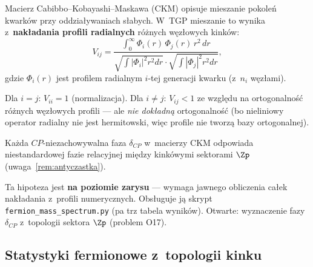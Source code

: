 \begin{hypothesis}%
\label{hyp:ckm}
Macierz Cabibbo--Kobayashi--Maskawa (CKM) opisuje mieszanie
pokole\'n kwarków przy oddzia\l{}ywaniach s\l{}abych.
W~TGP mieszanie to wynika z~\textbf{nak\l{}adania profili
radialnych} r\'o\.znych w\k{e}z\l{}owych kink\'ow:
\begin{equation}\label{eq:ckm-overlap}
    V_{ij}
    = \frac{\int_0^\infty \Phi_i(r)\,\Phi_j(r)\,r^2\,dr}
           {\sqrt{\int|\Phi_i|^2 r^2 dr}\cdot\sqrt{\int|\Phi_j|^2 r^2 dr}},
\end{equation}
gdzie $\Phi_i(r)$ jest profilem radialnym $i$-tej generacji kwarku
(z~$n_i$ w\k{e}z\l{}ami).

Dla $i = j$: $V_{ii} = 1$ (normalizacja).
Dla $i \neq j$: $V_{ij} < 1$ ze wzgl\k{e}du na ortogonalno\'s\'c
r\'o\.znych w\k{e}z\l{}owych profili --- ale \emph{nie dokładną}
ortogonalno\'s\'c (bo nieliniowy operator radialny nie jest
hermitowski, wi\k{e}c profile nie tworz\k{a} bazy ortogonalnej).

Ka\.zda $CP$-niezachowywalna faza $\delta_{CP}$ w~macierzy CKM
odpowiada niestandardowej fazie relacyjnej mi\k{e}dzy kink\'owymi
sektorami $\Zp$ (uwaga~\ref{rem:antyczastka}).
\end{hypothesis}

\begin{remark}
Ta hipoteza jest \textbf{na poziomie zarysu} --- wymaga jawnego
obliczenia ca\l{}ek nak\l{}adania z~profili numerycznych.
Obs\l{}uguje j\k{a} skrypt \texttt{fermion\_mass\_spectrum.py}
(pa trz tabela wynik\'ow). Otwarte: wyznaczenie fazy $\delta_{CP}$
z~topologii sektora $\Zp$ (problem O17).
\end{remark}

\subsection{Statystyki fermionowe z~topologii kinku}%
\label{app:F-statistics}

